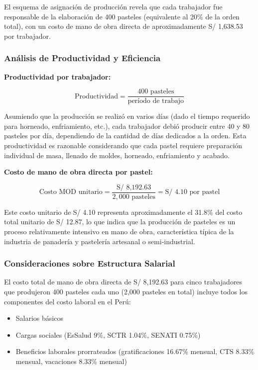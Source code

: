 \documentclass[
  stu,
  floatsintext,
  longtable,
  a4paper,
  nolmodern,
  notxfonts,
  notimes,
  12pt,
  colorlinks=true,linkcolor=blue,citecolor=blue,urlcolor=blue]{apa7}
\providecommand{\tightlist}{%
  \setlength{\itemsep}{0pt}\setlength{\parskip}{0pt}}
\begin{document}
El esquema de asignación de producción revela que cada trabajador fue
responsable de la elaboración de 400 pasteles (equivalente al 20\% de la
orden total), con un costo de mano de obra directa de aproximadamente S/
1,638.53 por trabajador.

\subsubsection{Análisis de Productividad y
Eficiencia}\label{anuxe1lisis-de-productividad-y-eficiencia}

\textbf{Productividad por trabajador:}

\[
\text{Productividad} = \frac{400 \text{ pasteles}}{\text{período de trabajo}}
\]

Asumiendo que la producción se realizó en varios días (dado el tiempo
requerido para horneado, enfriamiento, etc.), cada trabajador debió
producir entre 40 y 80 pasteles por día, dependiendo de la cantidad de
días dedicados a la orden. Esta productividad es razonable considerando
que cada pastel requiere preparación individual de masa, llenado de
moldes, horneado, enfriamiento y acabado.

\textbf{Costo de mano de obra directa por pastel:}

\[
\text{Costo MOD unitario} = \frac{\text{S/ 8,192.63}}{2,000 \text{ pasteles}} = \text{S/ 4.10 por pastel}
\]

Este costo unitario de S/ 4.10 representa aproximadamente el 31.8\% del
costo total unitario de S/ 12.87, lo que indica que la producción de
pasteles es un proceso relativamente intensivo en mano de obra,
característica típica de la industria de panadería y pastelería
artesanal o semi-industrial.

\subsubsection{Consideraciones sobre Estructura
Salarial}\label{consideraciones-sobre-estructura-salarial}

El costo total de mano de obra directa de S/ 8,192.63 para cinco
trabajadores que produjeron 400 pasteles cada uno (2,000 pasteles en
total) incluye todos los componentes del costo laboral en el Perú:

\begin{itemize}
\tightlist
\item
  Salarios básicos
\item
  Cargas sociales (EsSalud 9\%, SCTR 1.04\%, SENATI 0.75\%)
\item
  Beneficios laborales prorrateados (gratificaciones 16.67\% mensual,
  CTS 8.33\% mensual, vacaciones 8.33\% mensual)
\end{itemize}
\end{document}
